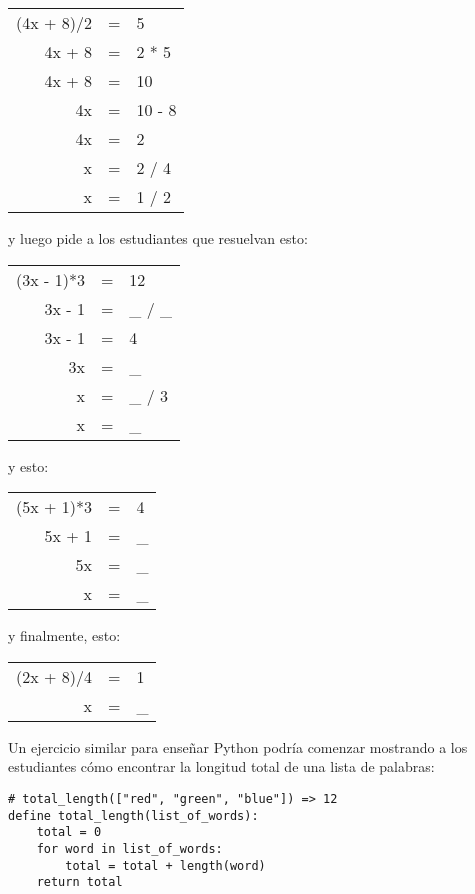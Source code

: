 \begin{center}
\begin{tabular}{rcl}
  (4x + 8)/2	& = &	5	\\
  4x + 8	& = &	2 * 5	\\
  4x + 8	& = &	10	\\
  4x		& = &	10 - 8	\\
  4x		& = &	2	\\
  x		& = &	2 / 4	\\
  x		& = &	1 / 2
\end{tabular}
\end{center}

\noindent
y luego pide a los estudiantes que resuelvan esto:

\begin{center}
\begin{tabular}{rcl}
  (3x - 1)*3	& = &	12	\\
  3x - 1	& = &	\_ / \_	\\
  3x - 1	& = &	4	\\
  3x		& = &	\_	\\
  x		& = &	\_ / 3	\\
  x		& = &	\_
\end{tabular}
\end{center}

\noindent
y esto:

\begin{center}
\begin{tabular}{rcl}
  (5x + 1)*3	& = &	4	\\
  5x + 1	& = &	\_ 	\\
  5x		& = &	\_ 	\\
  x		& = &	\_
\end{tabular}
\end{center}

\noindent
y finalmente, esto:

\begin{center}
\begin{tabular}{rcl}
  (2x + 8)/4	& = &	1	\\
   x		& = &	\_
\end{tabular}
\end{center}

Un ejercicio similar para enseñar Python podría comenzar mostrando a los estudiantes 
cómo encontrar la longitud total de una lista de palabras:

\begin{verbatim}
# total_length(["red", "green", "blue"]) => 12
define total_length(list_of_words):
    total = 0
    for word in list_of_words:
        total = total + length(word)
    return total
\end{verbatim}

